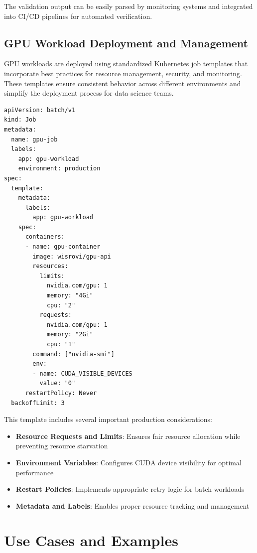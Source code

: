 \documentclass[12pt,a4paper]{report}
\begin{document}
The validation output can be easily parsed by monitoring systems and integrated into CI/CD pipelines for automated verification.

\section{GPU Workload Deployment and Management}
GPU workloads are deployed using standardized Kubernetes job templates that incorporate best practices for resource management, security, and monitoring. These templates ensure consistent behavior across different environments and simplify the deployment process for data science teams.

\begin{lstlisting}[caption=Production-Ready GPU Job Template,label=lst:gpu-job]
apiVersion: batch/v1
kind: Job
metadata:
  name: gpu-job
  labels:
    app: gpu-workload
    environment: production
spec:
  template:
    metadata:
      labels:
        app: gpu-workload
    spec:
      containers:
      - name: gpu-container
        image: wisrovi/gpu-api
        resources:
          limits:
            nvidia.com/gpu: 1
            memory: "4Gi"
            cpu: "2"
          requests:
            nvidia.com/gpu: 1
            memory: "2Gi"
            cpu: "1"
        command: ["nvidia-smi"]
        env:
        - name: CUDA_VISIBLE_DEVICES
          value: "0"
      restartPolicy: Never
  backoffLimit: 3
\end{lstlisting}

This template includes several important production considerations:
\begin{itemize}
    \item \textbf{Resource Requests and Limits}: Ensures fair resource allocation while preventing resource starvation
    \item \textbf{Environment Variables}: Configures CUDA device visibility for optimal performance
    \item \textbf{Restart Policies}: Implements appropriate retry logic for batch workloads
    \item \textbf{Metadata and Labels}: Enables proper resource tracking and management
\end{itemize}

\chapter{Use Cases and Examples}
\label{chap:use-cases}
\end{document}
